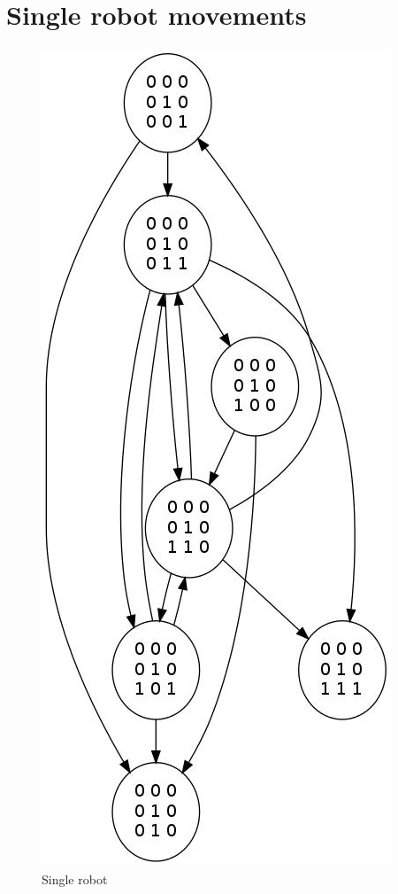 \documentclass[11pt, a4paper]{article}
\theoremstyle{plain}
\theoremstyle{definition}
\theoremstyle{remark}
\begin{document}
\section{Single robot movements}
\begin{figure}[H]
\includegraphics[scale=0.50]{graph_images/graph_single_all.jpg}
\caption{Single robot}
\label{graph:single}
\end{figure}
\end{document}
